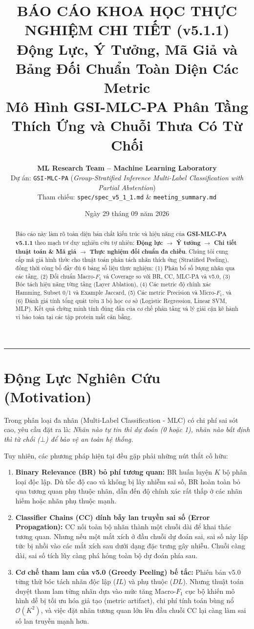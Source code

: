 \documentclass[11pt,a4paper]{article}
\title{\textbf{\LARGE BÁO CÁO KHOA HỌC THỰC NGHIỆM CHI TIẾT (v5.1.1)}\\[0.5em]
\Large Động Lực, Ý Tưởng, Mã Giả và Bảng Đối Chuẩn Toàn Diện Các Metric\\
Mô Hình GSI-MLC-PA Phân Tầng Thích Ứng và Chuỗi Thưa Có Từ Chối}
\author{\textbf{ML Research Team -- Machine Learning Laboratory}\\
Dự án: \texttt{GSI-MLC-PA} (\textit{Group-Stratified Inference Multi-Label Classification with Partial Abstention})\\
Tham chiếu: \texttt{spec/spec\_v5\_1\_1.md} \& \texttt{meeting\_summary.md}}
\date{Ngày 29 tháng 09 năm 2026}
\begin{document}
\maketitle

\begin{abstract}
Báo cáo này làm rõ toàn diện bản chất kiến trúc và hiệu năng của \textbf{GSI-MLC-PA v5.1.1} theo mạch tư duy nghiên cứu tự nhiên: \textbf{Động lực $\to$ Ý tưởng $\to$ Chi tiết thuật toán \& Mã giả $\to$ Thực nghiệm đối chuẩn đa chiều}. Chúng tôi cung cấp mã giả hình thức cho thuật toán phân tách nhãn thích ứng (Stratified Peeling), đồng thời công bố đầy đủ 6 bảng số liệu thực nghiệm: (1) Phân bổ số lượng nhãn qua các tầng, (2) Đối chuẩn Macro-$F_1$ và Coverage so với BR, CC, MLC-PA và v5.0, (3) Bóc tách hiệu năng từng tầng (Layer Ablation), (4) Các metric độ chính xác Hamming, Subset 0/1 và Example Jaccard, (5) Các metric Precision và Micro-$F_1$, và (6) Đánh giá tính tổng quát trên 3 bộ học cơ sở (Logistic Regression, Linear SVM, MLP). Kết quả chứng minh tính đúng đắn của cơ chế phân tầng và lý giải cặn kẽ hành vi bảo toàn tại các tập protein mất cân bằng.
\end{abstract}

\vspace{0.8em}
\hrule
\vspace{1.2em}

\section{Động Lực Nghiên Cứu (Motivation)}
Trong phân loại đa nhãn (Multi-Label Classification - MLC) có chi phí sai sót cao, yêu cầu đặt ra là: \textit{Nhãn nào tự tin thì dự đoán (0 hoặc 1), nhãn nào bất định thì từ chối ($\bot$) để bảo vệ an toàn hệ thống.}

Tuy nhiên, các phương pháp hiện tại đều gặp phải những nút thắt cố hữu:
\begin{enumerate}
    \item \textbf{Binary Relevance (BR) bỏ phí tương quan:} BR huấn luyện $K$ bộ phân loại độc lập. Dù tốc độ cao và không bị lây nhiễm sai số, BR hoàn toàn bỏ qua tương quan phụ thuộc nhãn, dẫn đến độ chính xác rất thấp ở các nhãn hiếm hoặc nhãn phụ thuộc mạnh.
    \item \textbf{Classifier Chains (CC) dính bẫy lan truyền sai số (Error Propagation):} CC nối toàn bộ nhãn thành một chuỗi dài để khai thác tương quan. Nhưng nếu một mắt xích ở đầu chuỗi dự đoán sai, sai số này lập tức bị nhồi vào các mắt xích sau dưới dạng đặc trưng gây nhiễu. Chuỗi càng dài, sai số tích lũy càng phá hỏng toàn bộ dự đoán phía sau.
    \item \textbf{Cơ chế tham lam của v5.0 (Greedy Peeling) bế tắc:} Phiên bản v5.0 từng thử bóc tách nhãn độc lập ($IL$) và phụ thuộc ($DL$). Nhưng thuật toán duyệt tham lam từng nhãn dựa vào mức tăng Macro-$F_1$ cục bộ khiến mô hình dễ bị tối ưu hóa giả tạo (metric artifact), chi phí tính toán bùng nổ $\mathcal{O}(K^2)$, và việc đặt nhãn tương quan lớn lên đầu chuỗi CC lại càng làm sai số lan truyền mạnh hơn.
\end{enumerate}
\end{document}
